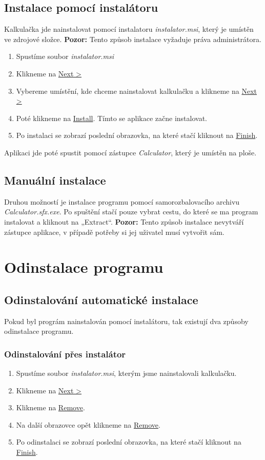 \documentclass[11pt,a4paper,titlepage]{article}
\begin{document}
\subsection{Instalace pomocí instalátoru}
Kalkulačka jde nainstalovat pomocí instalatoru \emph{instalator.msi}, který je umístěn ve zdrojové složce.
 \textbf{Pozor:} Tento způsob instalace vyžaduje práva administrátora.
\begin{enumerate}
  \item Spustíme soubor \emph{instalator.msi}
  \item Klikneme na \underline{Next >}
  \item Vybereme umístění, kde chceme nainstalovat kalkulačku a klikneme na \underline{Next >}
  \item Poté klikneme na \underline{Install}. Tímto se aplikace začne instalovat.
  \item Po instalaci se zobrazí poslední obrazovka, na které stačí kliknout na \underline{Finish}. 
\end{enumerate}
Aplikaci jde poté spustit pomocí zástupce \emph{Calculator}, který je umístěn na ploše.
\subsection{Manuální instalace}
Druhou možností je instalace programu pomocí samorozbalovacího archivu \emph{Calculator.sfx.exe}. Po spuštění stačí pouze vybrat cestu, do které se ma program instalovat a kliknout na „Extract“.
\textbf{Pozor:} Tento způsob instalace nevytváří zástupce aplikace, v případě potřeby si jej uživatel musí vytvořit sám.
\section{Odinstalace programu}
\subsection{Odinstalování automatické instalace}
Pokud byl prográm nainstalován pomocí instalátoru, tak existují dva způsoby odinstalace programu.
\subsubsection{Odinstalování přes instalátor}
\begin{enumerate}
  \item Spustíme soubor \emph{instalator.msi}, kterým jsme nainstalovali kalkulačku.
  \item Klikneme na \underline{Next >}
  \item Klikneme na \underline{Remove}.
  \item Na další obrazovce opět klikneme na \underline{Remove}.
  \item Po odinstalaci se zobrazí poslední obrazovka, na které stačí kliknout na \underline{Finish}. 
\end{enumerate}
\end{document}
